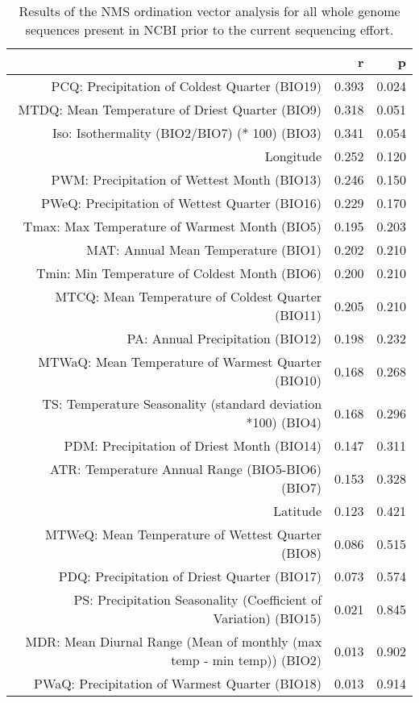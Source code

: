\begin{table}[ht]
\centering
\begin{tabular}{rrr}
  \hline
 & r & p \\ 
  \hline
PCQ: Precipitation of Coldest Quarter (BIO19) & 0.393 & 0.024 \\ 
  MTDQ: Mean Temperature of Driest Quarter (BIO9) & 0.318 & 0.051 \\ 
  Iso: Isothermality (BIO2/BIO7) (* 100) (BIO3) & 0.341 & 0.054 \\ 
  Longitude & 0.252 & 0.120 \\ 
  PWM: Precipitation of Wettest Month (BIO13) & 0.246 & 0.150 \\ 
  PWeQ: Precipitation of Wettest Quarter (BIO16) & 0.229 & 0.170 \\ 
  Tmax: Max Temperature of Warmest Month (BIO5) & 0.195 & 0.203 \\ 
  MAT: Annual Mean Temperature (BIO1) & 0.202 & 0.210 \\ 
  Tmin: Min Temperature of Coldest Month (BIO6) & 0.200 & 0.210 \\ 
  MTCQ: Mean Temperature of Coldest Quarter (BIO11) & 0.205 & 0.210 \\ 
  PA: Annual Precipitation (BIO12) & 0.198 & 0.232 \\ 
  MTWaQ: Mean Temperature of Warmest Quarter (BIO10) & 0.168 & 0.268 \\ 
  TS: Temperature Seasonality (standard deviation *100) (BIO4) & 0.168 & 0.296 \\ 
  PDM: Precipitation of Driest Month (BIO14) & 0.147 & 0.311 \\ 
  ATR: Temperature Annual Range (BIO5-BIO6) (BIO7) & 0.153 & 0.328 \\ 
  Latitude & 0.123 & 0.421 \\ 
  MTWeQ: Mean Temperature of Wettest Quarter (BIO8) & 0.086 & 0.515 \\ 
  PDQ: Precipitation of Driest Quarter (BIO17) & 0.073 & 0.574 \\ 
  PS: Precipitation Seasonality (Coefficient of Variation) (BIO15) & 0.021 & 0.845 \\ 
  MDR: Mean Diurnal Range (Mean of monthly (max temp - min temp)) (BIO2) & 0.013 & 0.902 \\ 
  PWaQ: Precipitation of Warmest Quarter (BIO18) & 0.013 & 0.914 \\ 
   \hline
\end{tabular}
\caption{Results of the NMS ordination vector analysis for all whole genome sequences present in NCBI prior to the current sequencing effort.} 
\label{tab:wc_napg_vec}
\end{table}
